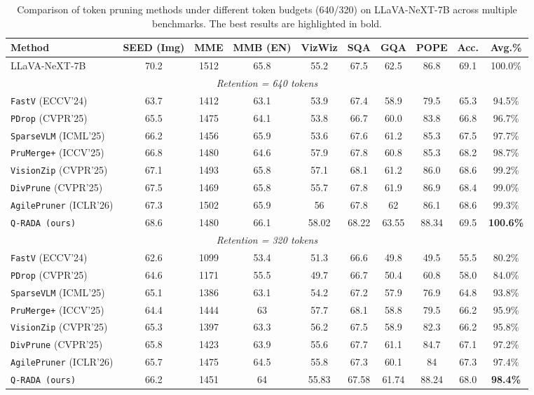\begin{table}[t]
\centering
\small
\setlength{\tabcolsep}{5.5pt}
\caption{Comparison of token pruning methods under different token budgets (640/320) on LLaVA-NeXT-7B across multiple benchmarks. The best results are highlighted in bold.}
\label{tab:results-next-7b}
\begin{tabular}{l|ccccccc|cc}
\toprule
\textbf{Method} & SEED (Img) & MME & MMB (EN) & VizWiz & SQA & GQA & POPE & Acc. & Avg.\% \\
\midrule
LLaVA-NeXT-7B & 70.2 & 1512 & 65.8 & 55.2 & 67.5 & 62.5 & 86.8 & 69.1 & 100.0\% \\
\midrule
\multicolumn{10}{c}{\textit{Retention = 640 tokens}} \\
\midrule
\texttt{FastV} (ECCV'24) & 63.7 & 1412 & 63.1 & 53.9 & 67.4 & 58.9 & 79.5 & 65.3 & 94.5\% \\
\texttt{PDrop} (CVPR'25) & 65.5 & 1475 & 64.1 & 53.8 & 66.7 & 60.0 & 83.8 & 66.8 & 96.7\% \\
\texttt{SparseVLM} (ICML'25) & 66.2 & 1456 & 65.9 & 53.6 & 67.6 & 61.2 & 85.3 & 67.5 & 97.7\% \\
\texttt{PruMerge+} (ICCV'25) & 66.8 & 1480 & 64.6 & 57.9 & 67.8 & 60.8 & 85.3 & 68.2 & 98.7\% \\
\texttt{VisionZip} (CVPR'25) & 67.1 & 1493 & 65.8 & 57.1 & 68.1 & 61.2 & 86.0 & 68.6 & 99.2\% \\
\texttt{DivPrune} (CVPR'25) & 67.5 & 1469 & 65.8 & 55.7 & 67.8 & 61.9 & 86.9 & 68.4 & 99.0\% \\
\texttt{AgilePruner} (ICLR'26) & 67.3 & 1502 & 65.9 & 56 & 67.8 & 62 & 86.1 & 68.6 & 99.3\% \\
\rowcolor{gray!20} \texttt{Q-RADA (ours)} & 68.6 & 1480 & 66.1 & 58.02 & 68.22 & 63.55 & 88.34 & 69.5 & \textbf{100.6\%} \\
\midrule
\multicolumn{10}{c}{\textit{Retention = 320 tokens}} \\
\midrule
\texttt{FastV} (ECCV'24) & 62.6 & 1099 & 53.4 & 51.3 & 66.6 & 49.8 & 49.5 & 55.5 & 80.2\% \\
\texttt{PDrop} (CVPR'25) & 64.6 & 1171 & 55.5 & 49.7 & 66.7 & 50.4 & 60.8 & 58.0 & 84.0\% \\
\texttt{SparseVLM} (ICML'25) & 65.1 & 1386 & 63.1 & 54.2 & 67.2 & 57.9 & 76.9 & 64.8 & 93.8\% \\
\texttt{PruMerge+} (ICCV'25) & 64.4 & 1444 & 63 & 57.7 & 68.1 & 58.8 & 79.5 & 66.2 & 95.9\% \\
\texttt{VisionZip} (CVPR'25) & 65.3 & 1397 & 63.3 & 56.2 & 67.5 & 58.9 & 82.3 & 66.2 & 95.8\% \\
\texttt{DivPrune} (CVPR'25) & 65.8 & 1423 & 63.9 & 55.6 & 67.7 & 61.1 & 84.7 & 67.1 & 97.2\% \\
\texttt{AgilePruner} (ICLR'26) & 65.7 & 1475 & 64.5 & 55.8 & 67.3 & 60.1 & 84 & 67.3 & 97.4\% \\
\rowcolor{gray!20}\texttt{Q-RADA (ours)} & 66.2 & 1451 & 64 & 55.83 & 67.58 & 61.74 & 88.24 & 68.0 & \textbf{98.4\%} \\
\bottomrule
\end{tabular}
\end{table}
